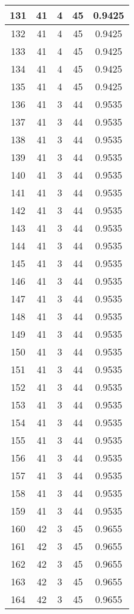 \documentclass[letterpaper, 12pt]{article}
\begin{document}
\begin{longtable}{|c|c|c|c|c|}
\hline
131 & 41 & 4 & 45 & 0.9425 \\
\hline
132 & 41 & 4 & 45 & 0.9425 \\
\hline
133 & 41 & 4 & 45 & 0.9425 \\
\hline
134 & 41 & 4 & 45 & 0.9425 \\
\hline
135 & 41 & 4 & 45 & 0.9425 \\
\hline
136 & 41 & 3 & 44 & 0.9535 \\
\hline
137 & 41 & 3 & 44 & 0.9535 \\
\hline
138 & 41 & 3 & 44 & 0.9535 \\
\hline
139 & 41 & 3 & 44 & 0.9535 \\
\hline
140 & 41 & 3 & 44 & 0.9535 \\
\hline
141 & 41 & 3 & 44 & 0.9535 \\
\hline
142 & 41 & 3 & 44 & 0.9535 \\
\hline
143 & 41 & 3 & 44 & 0.9535 \\
\hline
144 & 41 & 3 & 44 & 0.9535 \\
\hline
145 & 41 & 3 & 44 & 0.9535 \\
\hline
146 & 41 & 3 & 44 & 0.9535 \\
\hline
147 & 41 & 3 & 44 & 0.9535 \\
\hline
148 & 41 & 3 & 44 & 0.9535 \\
\hline
149 & 41 & 3 & 44 & 0.9535 \\
\hline
150 & 41 & 3 & 44 & 0.9535 \\
\hline
151 & 41 & 3 & 44 & 0.9535 \\
\hline
152 & 41 & 3 & 44 & 0.9535 \\
\hline
153 & 41 & 3 & 44 & 0.9535 \\
\hline
154 & 41 & 3 & 44 & 0.9535 \\
\hline
155 & 41 & 3 & 44 & 0.9535 \\
\hline
156 & 41 & 3 & 44 & 0.9535 \\
\hline
157 & 41 & 3 & 44 & 0.9535 \\
\hline
158 & 41 & 3 & 44 & 0.9535 \\
\hline
159 & 41 & 3 & 44 & 0.9535 \\
\hline
160 & 42 & 3 & 45 & 0.9655 \\
\hline
161 & 42 & 3 & 45 & 0.9655 \\
\hline
162 & 42 & 3 & 45 & 0.9655 \\
\hline
163 & 42 & 3 & 45 & 0.9655 \\
\hline
164 & 42 & 3 & 45 & 0.9655 \\

\end{longtable}
\end{document}
